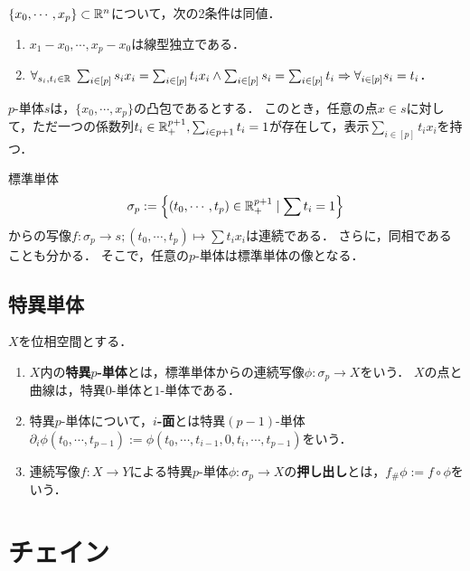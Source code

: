 \documentclass[uplatex,dvipdfmx]{jsreport}
\begin{document}
\begin{proposition}[単体の特徴付け]
    $\{x_0,\cdots,x_p\}\subset\mathbb{R}^n$について，次の2条件は同値．
    \begin{enumerate}
        \item $x_1-x_0,\cdots,x_p-x_0$は線型独立である．
        \item $\forall_{s_i,t_i\in\mathbb{R}}\;\sum_{i\in[p]}s_ix_i=\sum_{i\in[p]}t_ix_i\land\sum_{i\in[p]}s_i=\sum_{i\in[p]}t_i\Rightarrow\forall_{i\in[p]}s_i=t_i$．
    \end{enumerate}
\end{proposition}

\begin{corollary}
    $p$-単体$s$は，$\{x_0,\cdots,x_p\}$の凸包であるとする．
    このとき，任意の点$x\in s$に対して，ただ一つの係数列$t_i\in\mathbb{R}_+^{p+1},\sum_{i\in p+1}t_i=1$が存在して，表示$\sum_{i\in[p]}t_ix_i$を持つ．
\end{corollary}
\begin{remarks}
    標準単体
    \[\sigma_p:=\left\{(t_0,\cdots,t_p)\in\mathbb{R}_+^{p+1}\mid\sum t_i=1\right\}\]
    からの写像$f:\sigma_p\to s;(t_0,\cdots,t_p)\mapsto\sum t_ix_i$は連続である．
    さらに，同相であることも分かる．
    そこで，任意の$p$-単体は標準単体の像となる．
\end{remarks}

\subsection{特異単体}

\begin{definition}
    $X$を位相空間とする．
    \begin{enumerate}
        \item $X$内の\textbf{特異$p$-単体}とは，標準単体からの連続写像$\phi:\sigma_p\to X$をいう．
        $X$の点と曲線は，特異$0$-単体と$1$-単体である．
        \item 特異$p$-単体について，\textbf{$i$-面}とは特異$(p-1)$-単体$\partial_i\phi(t_0,\cdots,t_{p-1}):=\phi(t_0,\cdots,t_{i-1},0,t_i,\cdots,t_{p-1})$をいう．
        \item 連続写像$f:X\to Y$による特異$p$-単体$\phi:\sigma_p\to X$の\textbf{押し出し}とは，$f_\#\phi:=f\circ\phi$をいう．
    \end{enumerate}
\end{definition}

\section{チェイン}
\end{document}
